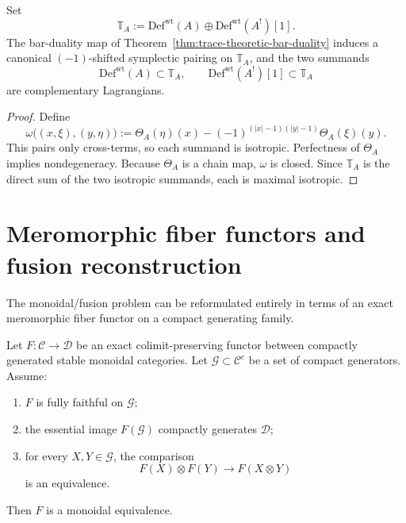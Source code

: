\begin{corollary}
\label{cor:lagrangian-envelope}
Set
\[
\mathbb{T}_A:=\mathrm{Def}^{\mathrm{wt}}(A)\oplus \mathrm{Def}^{\mathrm{wt}}(A^!)[1].
\]
The bar-duality map of Theorem~\ref{thm:trace-theoretic-bar-duality} induces a
canonical $(-1)$-shifted symplectic pairing on $\mathbb{T}_A$, and the two
summands
\[
\mathrm{Def}^{\mathrm{wt}}(A)\subset \mathbb{T}_A,
\qquad
\mathrm{Def}^{\mathrm{wt}}(A^!)[1]\subset \mathbb{T}_A
\]
are complementary Lagrangians.
\end{corollary}

\begin{proof}
Define
\[
\omega\big((x,\xi),(y,\eta)\big)
:=\Theta_A(\eta)(x)-(-1)^{(|x|-1)(|y|-1)}\Theta_A(\xi)(y).
\]
This pairs only cross-terms, so each summand is isotropic.  Perfectness of
$\Theta_A$ implies nondegeneracy.  Because $\Theta_A$ is a chain map, $\omega$
is closed.  Since $\mathbb{T}_A$ is the direct sum of the two isotropic
summands, each is maximal isotropic.
\end{proof}

\section{Meromorphic fiber functors and fusion reconstruction}
\label{sec:meromorphic-fiber-functors-fusion}

The monoidal/fusion problem can be reformulated entirely in terms of an exact
meromorphic fiber functor on a compact generating family.

\begin{lemma}
\label{lem:generator-extension-exact-monoidal}
Let $F\colon \mathcal{C}\to \mathcal{D}$ be an exact colimit-preserving functor
between compactly generated stable monoidal categories.  Let
$\mathcal{G}\subset \mathcal{C}^c$ be a set of compact generators.  Assume:
\begin{enumerate}[label=\textup{(\roman*)}]
\item $F$ is fully faithful on $\mathcal{G}$;
\item the essential image $F(\mathcal{G})$ compactly generates $\mathcal{D}$;
\item for every $X,Y\in\mathcal{G}$, the comparison
  \[
  F(X)\otimes F(Y)\longrightarrow F(X\otimes Y)
  \]
  is an equivalence.
\end{enumerate}
Then $F$ is a monoidal equivalence.
\end{lemma}

